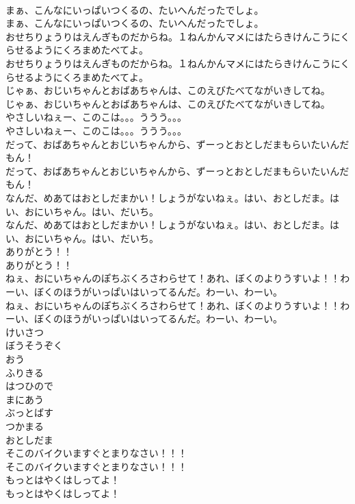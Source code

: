 \documentclass[8pt]{extreport}
\begin{document}
\begin{CJK}{UTF8}{min}
\\	まぁ、こんなにいっぱいつくるの、たいへんだったでしょ。
\\	まぁ、こんなにいっぱいつくるの、たいへんだったでしょ。
\\	おせちりょうりはえんぎものだからね。１ねんかんマメにはたらきけんこうにくらせるようにくろまめたべてよ。
\\	おせちりょうりはえんぎものだからね。１ねんかんマメにはたらきけんこうにくらせるようにくろまめたべてよ。
\\	じゃぁ、おじいちゃんとおばあちゃんは、このえびたべてながいきしてね。
\\	じゃぁ、おじいちゃんとおばあちゃんは、このえびたべてながいきしてね。
\\	やさしいねぇー、このこは。。。ううう。。。
\\	やさしいねぇー、このこは。。。ううう。。。
\\	だって、おばあちゃんとおじいちゃんから、ずーっとおとしだまもらいたいんだもん！
\\	だって、おばあちゃんとおじいちゃんから、ずーっとおとしだまもらいたいんだもん！
\\	なんだ、めあてはおとしだまかい！しょうがないねぇ。はい、おとしだま。はい、おにいちゃん。はい、だいち。
\\	なんだ、めあてはおとしだまかい！しょうがないねぇ。はい、おとしだま。はい、おにいちゃん。はい、だいち。
\\	ありがとう！！
\\	ありがとう！！
\\	ねぇ、おにいちゃんのぽちぶくろさわらせて！あれ、ぼくのよりうすいよ！！わーい、ぼくのほうがいっぱいはいってるんだ。わーい、わーい。
\\	ねぇ、おにいちゃんのぽちぶくろさわらせて！あれ、ぼくのよりうすいよ！！わーい、ぼくのほうがいっぱいはいってるんだ。わーい、わーい。
\\	けいさつ
\\	ぼうそうぞく
\\	おう
\\	ふりきる
\\	はつひので
\\	まにあう
\\	ぶっとばす
\\	つかまる
\\	おとしだま
\\	そこのバイクいますぐとまりなさい！！！
\\	そこのバイクいますぐとまりなさい！！！
\\	もっとはやくはしってよ！
\\	もっとはやくはしってよ！

\end{CJK}
\end{document}
